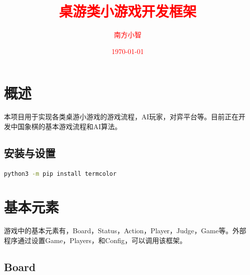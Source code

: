 \documentclass[export, 12pt, letterpaper]{ctexrep}
\title{\fontsize{40}{20} \textbf{\textcolor{red}{\kaishu 桌游类小游戏开发框架}}}
\author{\textcolor{red}{南方小智}}
\date{\textcolor{red}{\today}}
\begin{document}
\maketitle
\thispagestyle{empty}
\newpage

\setcounter{page}{1}
\tableofcontents
\newpage

\begin{center}

\end{center}


\chapter{概述}

本项目用于实现各类桌游小游戏的游戏流程，AI玩家，对弈平台等。目前正在开发中国象棋的基本游戏流程和AI算法。

\section{安装与设置}
\begin{lstlisting}[language=Bash]
python3 -m pip install termcolor
\end{lstlisting}

\chapter{基本元素}


游戏中的基本元素有，Board，Status，Action，Player，Judge，Game等。外部程序通过设置Game，Players，和Config，可以调用该框架。

\section{Board}
\end{document}
